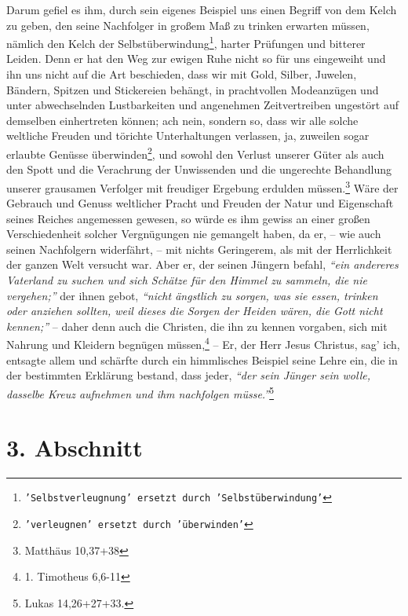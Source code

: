 Darum gefiel es ihm, durch sein eigenes Beispiel uns einen Begriff von dem
Kelch zu geben, den seine Nachfolger in großem Maß zu
trinken erwarten müssen,
nämlich den Kelch der Selbstüberwindung\footnote{\texttt{'Selbstverleugnung'
ersetzt durch 'Selbstüberwindung'}},
harter Prüfungen und bitterer Leiden.
Denn er hat den Weg zur ewigen Ruhe nicht so für uns
eingeweiht und ihn uns
nicht auf die Art beschieden, dass wir mit Gold, Silber, Juwelen, Bändern,
Spitzen und Stickereien behängt, in prachtvollen Modeanzügen und unter
abwechselnden Lustbarkeiten und angenehmen Zeitvertreiben ungestört auf
demselben einhertreten können; ach nein, sondern so, dass wir alle solche
weltliche Freuden und törichte Unterhaltungen verlassen, ja, zuweilen sogar
erlaubte Genüsse überwinden\footnote{\texttt{'verleugnen' ersetzt durch
'überwinden'}},
und sowohl den Verlust unserer Güter als auch den
Spott und die Verachrung der Unwissenden und die ungerechte Behandlung unserer
grausamen Verfolger mit freudiger Ergebung erdulden
müssen.\footnote{Matthäus 10,37+38 }
Wäre der Gebrauch und Genuss weltlicher Pracht und Freuden der Natur
und Eigenschaft seines Reiches angemessen gewesen, so würde es ihm gewiss an
einer großen Verschiedenheit solcher Vergnügungen nie gemangelt haben, da er, --
wie auch seinen Nachfolgern widerfährt, -- mit nichts Geringerem, als mit der
Herrlichkeit der ganzen Welt versucht war. Aber er, der seinen Jüngern befahl,
\textit{"`ein andereres Vaterland zu suchen und sich Schätze für den Himmel zu
sammeln, die nie vergehen;"'} der ihnen gebot,
\textit{"`nicht ängstlich zu sorgen, was sie essen,
trinken oder anziehen sollten, weil dieses die Sorgen der Heiden wären,
die Gott nicht kennen;"'} -- daher denn auch die Christen, die ihn zu kennen
vorgaben, sich mit Nahrung und Kleidern begnügen müssen,\footnote{1. Timotheus
6,6-11}
-- Er, der Herr Jesus Christus, sag’ ich, entsagte allem und schärfte
durch ein himmlisches Beispiel seine Lehre ein, die in der bestimmten Erklärung
bestand, dass jeder,
\textit{"`der sein Jünger sein wolle, dasselbe Kreuz aufnehmen und
ihm nachfolgen müsse."'}\footnote{Lukas 14,26+27+33.}

\section{3. Abschnitt} \label{kap16_ab3}


